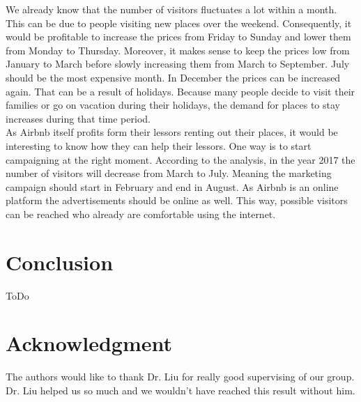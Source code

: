We already know that the number of visitors fluctuates a lot within a month. This can be due to people visiting new places over the weekend. Consequently, it would be profitable to increase the prices from Friday to Sunday and lower them from Monday to Thursday. Moreover, it makes sense to keep the prices low from January to March before slowly increasing them from March to September. July should be the most expensive month. In December the prices can be increased again. That can be a result of holidays. Because many people decide to visit their families or go on vacation during their holidays, the demand for places to stay increases during that time period. \\
As Airbnb itself profits form their lessors renting out their places, it would be interesting to know how they can help their lessors. One way is to start campaigning at the right moment. According to the analysis, in the year 2017 the number of visitors will decrease from March to July. Meaning the marketing campaign should start in February and end in August. As Airbnb is an online platform the advertisements should be online as well. This way, possible visitors can be reached who already are comfortable using the internet. 

%
\section{Conclusion}
ToDo



\section*{Acknowledgment}
The authors would like to thank Dr. Liu for really good supervising of our group. Dr. Liu helped us so much and we wouldn't have reached this result without him. 




%

